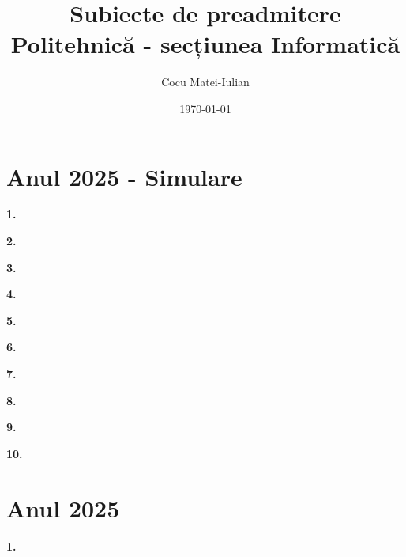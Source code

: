 \documentclass[11pt, a4paper]{article}
\title{Subiecte de preadmitere Politehnică - secțiunea Informatică}
\author{Cocu Matei-Iulian}
\date{\today}
\begin{document}
\maketitle
\tableofcontents
\newpage


\section{Anul 2025 - Simulare}
\textbf{1.}\newline


\vspace{0.5cm}

\textbf{2.}\newline


\vspace{0.5cm}

\textbf{3.}\newline


\vspace{0.5cm}

\textbf{4.}\newline


\vspace{0.5cm}

\textbf{5.}\newline


\vspace{0.5cm}

\textbf{6.}\newline


\vspace{0.5cm}

\textbf{7.}\newline


\vspace{0.5cm}

\textbf{8.}\newline


\vspace{0.5cm}

\textbf{9.}\newline


\vspace{0.5cm}

\textbf{10.}\newline


\section{Anul 2025}
\textbf{1.}\newline


\vspace{0.5cm}
\end{document}
